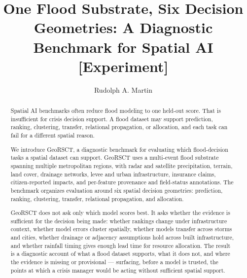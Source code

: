 \documentclass[sigconf,nonacm]{acmart}
\begin{document}
\title{One Flood Substrate, Six Decision Geometries: A Diagnostic Benchmark for Spatial AI [Experiment]}

\author{Rudolph A. Martin}


\begin{abstract}
Spatial AI benchmarks often reduce flood modeling to one held-out score.
That is insufficient for crisis decision support. A flood dataset may
support prediction, ranking, clustering, transfer, relational propagation,
or allocation, and each task can fail for a different spatial reason.

We introduce GeoRSCT, a diagnostic benchmark for evaluating which
flood-decision tasks a spatial dataset can support. GeoRSCT uses a
multi-event flood substrate spanning multiple metropolitan regions, with
radar and satellite precipitation, terrain, land cover, drainage networks,
levee and urban infrastructure, insurance claims, citizen-reported impacts,
and per-feature provenance and field-status annotations. The benchmark
organizes evaluation around six spatial decision geometries: prediction,
ranking, clustering, transfer, relational propagation, and allocation.

GeoRSCT does not ask only which model scores best. It asks whether the
evidence is sufficient for the decision being made: whether rankings change
under infrastructure context, whether model errors cluster spatially,
whether models transfer across storms and cities, whether drainage or
adjacency assumptions hold across built infrastructure, and whether rainfall
timing gives enough lead time for resource allocation. The result is a
diagnostic account of what a flood dataset supports, what it does not, and
where the evidence is missing or provisional --- surfacing, before a model
is trusted, the points at which a crisis manager would be acting without
sufficient spatial support.
\end{abstract}
\end{document}
